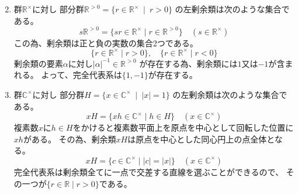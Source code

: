 \documentclass[12pt,b5paper]{ltjsarticle}
\begin{document}
\begin{enumerate}
\begin{enumerate}
\[            \]
      \end{enumerate}
 \item
      群$\mathbb{R}^\times$に対し
      部分群$\mathbb{R}^{>0}=\{r\in\mathbb{R}^\times \ \mid\ r>0\}$
      の左剰余類は次のような集合である。
      \[
       s\mathbb{R}^{>0} = \{ sr \in\mathbb{R}^\times \mid r\in\mathbb{R}^{>0}\}
      \quad (s\in\mathbb{R}^{\times})
      \]
      この為、剰余類は正と負の実数の集合2つである。
      \[
        \{r\in\mathbb{R}^\times \mid r>0\},\quad
        \{r\in\mathbb{R}^\times \mid r<0\}
      \]
      剰余類の要素$\alpha$に対し$\lvert\alpha\rvert^{-1}\in\mathbb{R}^{>0}$
      が存在する為、剰余類には$1$又は$-1$が含まれる。
      よって、完全代表系は$\{1, -1\}$が存在する。
 \item
      群$\mathbb{C}^\times$に対し
      部分群$H = \{ x\in\mathbb{C}^\times \ \mid\ \lvert x \rvert = 1 \}$
      の左剰余類は次のような集合である。
      \[
       xH = \{ xh \in\mathbb{C}^\times \mid h\in H\}
      \quad (x\in\mathbb{C}^{\times})
      \]
      複素数$x$に$h\in H$をかけると複素数平面上を原点を中心として回転した位置に
      $xh$がある。
      その為、剰余類$xH$は原点を中心とした同心円上の点全体となる。
      \[
       xH=\{c\in\mathbb{C}^\times \mid \lvert c \rvert = \lvert x \rvert \}
       \quad (x\in\mathbb{C}^\times)
      \]
      完全代表系は剰余類全てに一点で交差する直線を選ぶことができるので、
      その一つが$\{r\in\mathbb{R} \mid r>0\}$である。
\end{enumerate}
\end{document}
